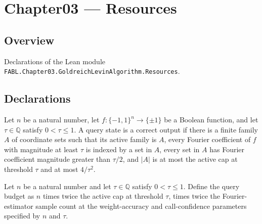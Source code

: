 \chapter{Chapter03 — Resources}
\section{Overview}

Declarations of the Lean module \texttt{FABL.Chapter03.GoldreichLevinAlgorithm.Resources}.

\section{Declarations}

\begin{definition}
\label{FABL.GoldreichLevinQueryState.IsCorrectOutput}
\leanok
{}
Let $n$ be a natural number, let $f:\{-1,1\}^n\to\{\pm1\}$ be a Boolean function, and
let $\tau\in\mathbb{Q}$ satisfy $0<\tau\leq 1$. A query state is a correct output if
there is a finite family $A$ of coordinate sets such that its active family is $A$,
every Fourier coefficient of $f$ with magnitude at least $\tau$ is indexed by a set in
$A$, every set in $A$ has Fourier coefficient magnitude greater than $\tau/2$, and $|A|$
is at most the active cap at threshold $\tau$ and at most $4/\tau^2$.
\end{definition}

\begin{definition}
\label{FABL.goldreichLevinQueryBudget}
\leanok
{}
Let $n$ be a natural number and let $\tau\in\mathbb{Q}$ satisfy $0<\tau\leq 1$. Define
the query budget as $n$ times twice the active cap at threshold $\tau$, times twice the
Fourier-estimator sample count at the weight-accuracy and call-confidence parameters
specified by $n$ and $\tau$.
\end{definition}

